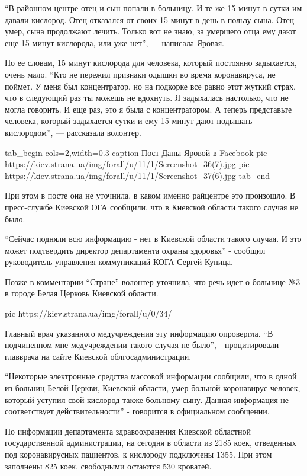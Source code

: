 \enquote{В районном центре отец и сын попали в больницу. И те же 15 минут в сутки
им давали кислород. Отец отказался от своих 15 минут в день в пользу сына.
Отец умер, сына продолжают лечить. Только вот не знаю, за умершего отца
ему дают еще 15 минут кислорода, или уже нет}, — написала Яровая.

По ее словам, 15 минут кислорода для человека, который постоянно
задыхается, очень мало. \enquote{Кто не пережил признаки одышки во время
коронавируса, не поймет. У меня был концентратор, но на подкорке все равно
этот жуткий страх, что в следующий раз ты можешь не вдохнуть. Я задыхалась
настолько, что не могла говорить. И еще раз, это я была с концентратором.
А теперь представьте человека, который задыхается сутки и ему 15 минут
дают подышать кислородом}, — рассказала волонтер.

\ifcmt
tab_begin cols=2,width=0.3
  caption Пост Даны Яровой в Facebook
  pic https://kiev.strana.ua/img/forall/u/11/1/Screenshot_36(7).jpg
  pic https://kiev.strana.ua/img/forall/u/11/1/Screenshot_37(6).jpg
tab_end
\fi

При этом в посте она не уточнила, в каком именно райцентре это произошло.
В пресс-службе Киевской ОГА сообщили, что в Киевской области такого случая
не было.

\enquote{Сейчас подняли всю информацию - нет в Киевской области такого случая. И
это может подтвердить директор департамента охраны здоровья} - сообщил
руководитель управления коммуникаций КОГА Сергей Куница.

Позже в комментарии \enquote{Стране} волонтер уточнила, что речь идет о больнице
№3 в городе Белая Церковь Киевской области.

\ifcmt
pic https://kiev.strana.ua/img/forall/u/0/34/%
\fi

Главный врач указанного медучреждения эту информацию опровергла. \enquote{В
подчиненном мне медучреждении такого случая не было}, -  процитировали
главврача на сайте Киевской облгосадминистрации.

\enquote{Некоторые электронные средства массовой информации сообщили, что в одной
из больниц Белой Церкви, Киевской области, умер больной коронавирус
человек, который уступил свой кислород также больному сыну. Данная
информация не соответствует действительности} - говорится в официальном
сообщении.

По информации департамента здравоохранения Киевской областной
государственной администрации, на сегодня в области из 2185 коек,
отведенных под коронавирусных пациентов, к кислороду подключены 1355. При
этом заполнены 825 коек, свободными остаются 530 кроватей.

